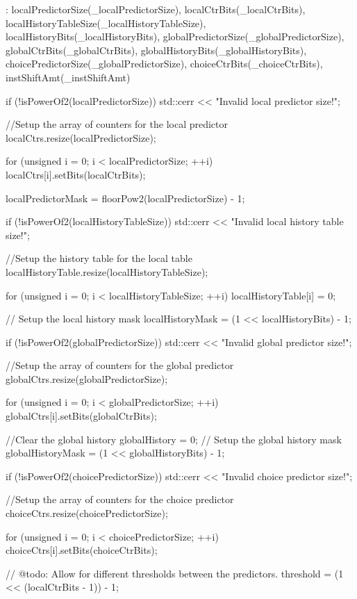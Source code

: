 \begin{DoxyCode}
    : localPredictorSize(_localPredictorSize),
      localCtrBits(_localCtrBits),
      localHistoryTableSize(_localHistoryTableSize),
      localHistoryBits(_localHistoryBits),
      globalPredictorSize(_globalPredictorSize),
      globalCtrBits(_globalCtrBits),
      globalHistoryBits(_globalHistoryBits),
      choicePredictorSize(_globalPredictorSize),
      choiceCtrBits(_choiceCtrBits),
      instShiftAmt(_instShiftAmt)
{
    if (!isPowerOf2(localPredictorSize)) {
        std::cerr << "Invalid local predictor size!\n";
    }

    //Setup the array of counters for the local predictor
    localCtrs.resize(localPredictorSize);

    for (unsigned i = 0; i < localPredictorSize; ++i)
        localCtrs[i].setBits(localCtrBits);

    localPredictorMask = floorPow2(localPredictorSize) - 1;

    if (!isPowerOf2(localHistoryTableSize)) {
        std::cerr << "Invalid local history table size!\n";
    }

    //Setup the history table for the local table
    localHistoryTable.resize(localHistoryTableSize);

    for (unsigned i = 0; i < localHistoryTableSize; ++i)
        localHistoryTable[i] = 0;

    // Setup the local history mask
    localHistoryMask = (1 << localHistoryBits) - 1;

    if (!isPowerOf2(globalPredictorSize)) {
        std::cerr << "Invalid global predictor size!\n";
    }

    //Setup the array of counters for the global predictor
    globalCtrs.resize(globalPredictorSize);

    for (unsigned i = 0; i < globalPredictorSize; ++i)
        globalCtrs[i].setBits(globalCtrBits);

    //Clear the global history
    globalHistory = 0;
    // Setup the global history mask
    globalHistoryMask = (1 << globalHistoryBits) - 1;

    if (!isPowerOf2(choicePredictorSize)) {
        std::cerr << "Invalid choice predictor size!\n";
    }

    //Setup the array of counters for the choice predictor
    choiceCtrs.resize(choicePredictorSize);

    for (unsigned i = 0; i < choicePredictorSize; ++i)
        choiceCtrs[i].setBits(choiceCtrBits);

    // @todo: Allow for different thresholds between the predictors.
    threshold = (1 << (localCtrBits - 1)) - 1;
}
\end{DoxyCode}


